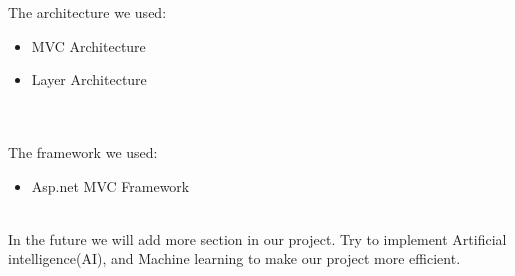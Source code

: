 The architecture we used:
\begin{itemize}
    \item MVC Architecture
    \item Layer Architecture
    
\end{itemize}
\\\\
The framework we used:
\begin{itemize}
    \item Asp.net MVC Framework
\end{itemize}
\\
In the future we will add more section in our project. Try to implement Artificial intelligence(AI), and Machine learning to make our project more efficient. 




